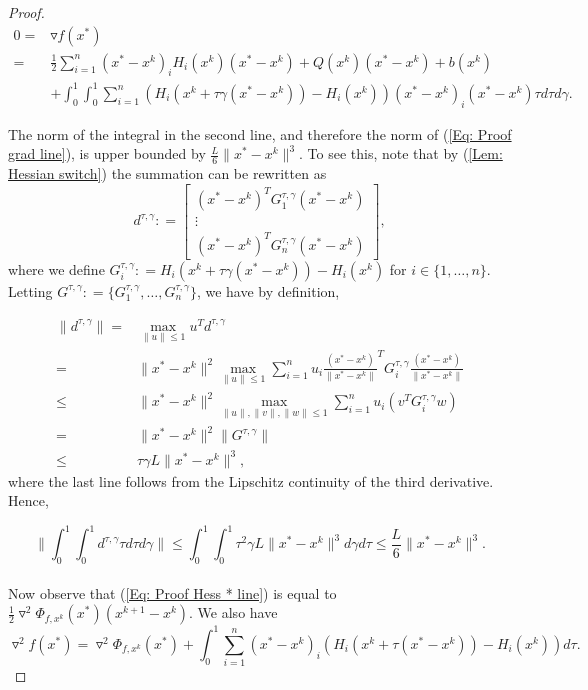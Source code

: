 \documentclass[11pt]{article}
\theoremstyle{plain}
\theoremstyle{definition}
\theoremstyle{remark}
\def \bmat{\left[\begin{matrix}}
\def \emat{\end{matrix}\right]}
\def \defeq{\mathrel{\mathop{:}}=}
\def \grad{\triangledown}
\def \Hess{\triangledown^2}
\def \otn{\{1, \ldots, n\}}
\begin{document}
\begin{proof}
\begin{align*}
    0 =& \grad f(x^*)\\
    =& \frac{1}{2} \sum_{i=1}^n (x^*-x^k)_iH_i(x^k)(x^*-x^k) + Q(x^k)(x^*-x^k) + b(x^k)\\
    & +\int_0^1\int_0^1 \sum_{i=1}^n \left(H_i(x^k + \tau\gamma (x^*-x^k))-H_i(x^k)\right)(x^*-x^k)_i(x^*-x^k) \tau d\tau d\gamma.
\end{align*}

The norm of the integral in the second line, and therefore the norm of (\ref{Eq: Proof grad line}), is upper bounded by $\frac{L}{6} \|x^*-x^k\|^3$. 
To see this, note that by (\ref{Lem: Hessian switch}) the summation can be rewritten as
$$d^{\tau,\gamma} \defeq \bmat (x^*-x^k)^TG_1^{\tau,\gamma}(x^*-x^k) \\ \vdots \\ (x^*-x^k)^TG_n^{\tau,\gamma}(x^*-x^k) \emat,$$ where we define $G_i^{\tau,\gamma} \defeq H_i(x^k + \tau\gamma (x^*-x^k))-H_i(x^k)$ for $i \in \otn$. Letting $G^{\tau,\gamma} \defeq \{G_1^{\tau,\gamma}, \ldots, G_n^{\tau,\gamma}\}$, we have by definition,

\begin{align*}
    \|d^{\tau, \gamma}\| =& \max_{\|u\|\le 1} u^Td^{\tau,\gamma}\\
    =& \|x^*-x^k\|^2 \max_{\|u\|\le 1} \sum_{i=1}^n u_i \frac{(x^*-x^k)}{\|x^*-x^k\|}^TG_i^{\tau,\gamma}\frac{(x^*-x^k)}{\|x^*-x^k\|}\\
    \leq& \|x^*-x^k\|^2 \max_{\|u\|, \|v\|, \|w\| \leq 1} \sum_{i=1}^n u_i (v^T G_i^{\tau,\gamma} w) \\
    =& \|x^*-x^k\|^2 \|G^{\tau,\gamma}\|\\
    \le& \tau\gamma L\|x^*-x^k\|^3,
\end{align*}
where the last line follows from the Lipschitz continuity of the third derivative. Hence,

\begin{equation}\label{Eq: Proof norm grad}\|\int_0^1\int_0^1 d^{\tau,\gamma} \tau d\tau d \gamma\| \leq \int_0^1 \int_0^1 \tau^2\gamma L\|x^*-x^k\|^3 d\gamma d\tau \le \frac{L}{6} \|x^*-x^k\|^3.\end{equation}\\

Now observe that (\ref{Eq: Proof Hess * line}) is equal to $\frac{1}{2}\Hess \Phi_{f,x^k}(x^*)(x^{k+1}-x^k)$. We also have
$$\Hess f(x^*) = \Hess \Phi_{f,x^k}(x^*) + \int_0^1\sum_{i=1}^n (x^*-x^k)_i\left(H_i(x^k + \tau (x^*-x^k))-H_i(x^k)\right)d\tau.$$


\end{proof}
\end{document}

